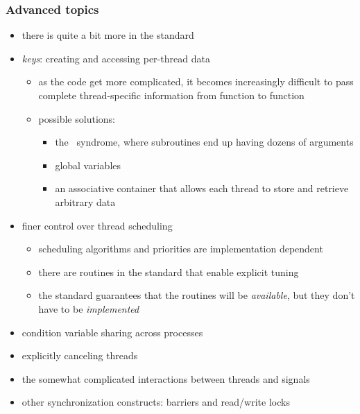 \begin{frame}[fragile]
%
  \frametitle{Advanced topics}
%
  \begin{itemize}
%
  \item there is quite a bit more in the standard
%
  \item {\em keys}: creating and accessing per-thread data
    \begin{itemize}
    \item as the code get more complicated, it becomes increasingly difficult to pass complete
      thread-specific information from function to function
    \item possible solutions:
      \begin{itemize}
      \item the \fortran\ syndrome, where subroutines end up having dozens of arguments
      \item global variables
      \item an associative container that allows each thread to store and retrieve arbitrary
        data
      \end{itemize}
%
    \end{itemize}
%
    \item finer control over thread scheduling
      \begin{itemize}
      \item scheduling algorithms and priorities are implementation dependent
      \item there are routines in the standard that enable explicit tuning
      \item the standard guarantees that the routines will be {\em available}, but they don't
        have to be {\em implemented}
      \end{itemize}
%
    \item condition variable sharing across processes
%
    \item explicitly canceling threads
%
    \item the somewhat complicated interactions between threads and signals
%
    \item other synchronization constructs: barriers and read/write locks
%
  \end{itemize}
%
\end{frame}

